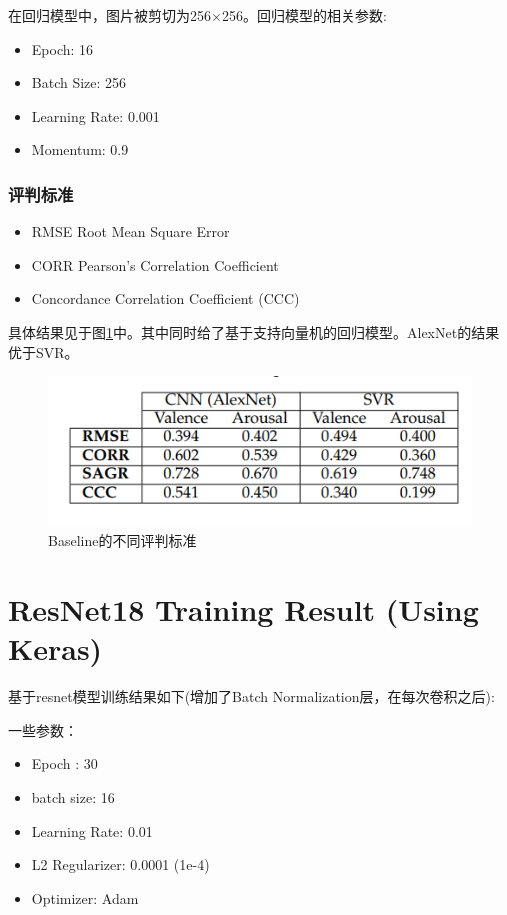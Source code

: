 \documentclass[11pt, a4paper]{article}
\begin{document}
\begin{CJK}{UTF8}{gbsn}
在回归模型中，图片被剪切为256$\times$256。回归模型的相关参数:

\begin{itemize}
	\item Epoch: 16
	\item Batch Size: 256
	\item Learning Rate: 0.001 
	\item Momentum: 0.9
\end{itemize}

\subsubsection{评判标准}

\begin{itemize}
\item RMSE Root Mean Square Error
\item CORR Pearson's Correlation Coefficient
\item Concordance Correlation Coefficient (CCC)
\end{itemize}

具体结果见于图\ref{Fig:t10}中。其中同时给了基于支持向量机的回归模型。AlexNet的结果优于SVR。

\begin{figure}[htbp]
	
	\centering %
	\includegraphics[width=15cm]{table10}
	
	\caption{Baseline的不同评判标准}
	\label{Fig:t10}
\end{figure}


\section{ResNet18 Training Result (Using Keras)}

基于resnet模型训练结果如下(增加了Batch Normalization层，在每次卷积之后):

一些参数：

\begin{itemize}
\item Epoch : 30
\item batch size: 16
\item Learning Rate: 0.01 
\item L2 Regularizer: 0.0001 (1e-4)
\item Optimizer: Adam
\end{itemize}


\end{CJK}
\end{document}
